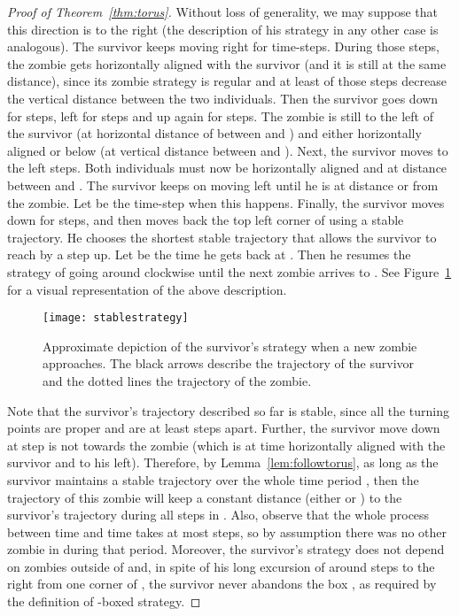 \documentclass[12pt]{amsart}
\begin{document}
\begin{proof}[Proof of Theorem~\ref{thm:torus}]
Without loss of generality, we may suppose that
this direction is to the right (the description of his strategy in any other case is analogous). The survivor keeps moving right for  time-steps. During those steps, the zombie gets
horizontally aligned with the survivor (and it is still at the same distance), since its zombie strategy is regular and at least  of those steps decrease the vertical distance between the
two individuals. Then the survivor goes down for  steps, left for  steps and up again for  steps. The zombie is still to the left of the survivor (at horizontal
distance of between  and ) and either horizontally aligned or below (at vertical distance between  and ). Next, the survivor moves to the left  steps.
Both individuals must now be horizontally aligned and at distance between  and . The survivor keeps on moving left until he is at distance  or  from the zombie. Let 
be the time-step when this happens. Finally, the survivor moves down for  steps, and then moves back the top left corner  of  using a stable trajectory. He chooses the shortest
stable trajectory that allows the survivor to reach  by a step up. Let  be the time he gets back at . Then he resumes the strategy of going around  clockwise until the next zombie arrives to .
See Figure~\ref{fig:stablestrategy} for a visual representation of the above description.

\begin{figure}
\texttt{[image: stablestrategy]}
\caption{Approximate depiction of the survivor's strategy when a new zombie approaches. The black arrows describe the trajectory of the survivor and the dotted lines the trajectory of the zombie.}
\label{fig:stablestrategy}
\end{figure}

Note that the survivor's trajectory described so far is stable, since all the turning points are proper and are at least  steps apart. Further, the survivor move down at step  is
not towards the zombie (which is at time  horizontally aligned with the survivor and to his left). Therefore, by Lemma~\ref{lem:followtorus}, as long as the survivor maintains a stable
trajectory over the whole time period , then the trajectory of this zombie will keep a constant distance (either  or ) to the survivor's trajectory during all steps in . Also, observe
that the whole process between time  and time  takes at most  steps, so by assumption there was no other zombie in  during that period. Moreover, the survivor's strategy
does not depend on zombies outside of  and, in spite of his long excursion of around  steps to the right from one corner of , the survivor never abandons the box , as required by the
definition of -boxed strategy.


\end{proof}
\end{document}
